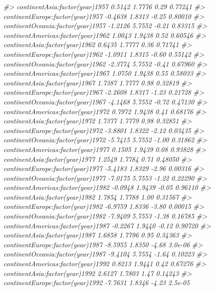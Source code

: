 \documentclass[]{book}
\newenvironment{Shaded}{\begin{snugshade}}{\end{snugshade}}
\newcommand{\CommentTok}[1]{\textcolor[rgb]{0.56,0.35,0.01}{\textit{#1}}}
\begin{document}
\begin{Shaded}
\begin{Highlighting}[]
\CommentTok{#> continentAsia:factor(year)1957       0.5142     1.7776    0.29  0.77241}
\CommentTok{#> continentEurope:factor(year)1957    -0.4638     1.8313   -0.25  0.80010}
\CommentTok{#> continentOceania:factor(year)1957   -1.2126     5.7552   -0.21  0.83315}
\CommentTok{#> continentAmericas:factor(year)1962   1.0043     1.9438    0.52  0.60546}
\CommentTok{#> continentAsia:factor(year)1962       0.6435     1.7777    0.36  0.71741}
\CommentTok{#> continentEurope:factor(year)1962    -1.0911     1.8315   -0.60  0.55142}
\CommentTok{#> continentOceania:factor(year)1962   -2.3774     5.7552   -0.41  0.67960}
\CommentTok{#> continentAmericas:factor(year)1967   1.0750     1.9438    0.55  0.58033}
\CommentTok{#> continentAsia:factor(year)1967       1.7387     1.7777    0.98  0.32819}
\CommentTok{#> continentEurope:factor(year)1967    -2.2608     1.8317   -1.23  0.21728}
\CommentTok{#> continentOceania:factor(year)1967   -4.1468     5.7552   -0.72  0.47130}
\CommentTok{#> continentAmericas:factor(year)1972   0.7972     1.9438    0.41  0.68176}
\CommentTok{#> continentAsia:factor(year)1972       1.7377     1.7779    0.98  0.32851}
\CommentTok{#> continentEurope:factor(year)1972    -3.8801     1.8322   -2.12  0.03435}
\CommentTok{#> continentOceania:factor(year)1972   -5.7415     5.7552   -1.00  0.31862}
\CommentTok{#> continentAmericas:factor(year)1977   0.1505     1.9439    0.08  0.93828}
\CommentTok{#> continentAsia:factor(year)1977       1.2549     1.7784    0.71  0.48050}
\CommentTok{#> continentEurope:factor(year)1977    -5.4183     1.8329   -2.96  0.00316}
\CommentTok{#> continentOceania:factor(year)1977   -7.0175     5.7553   -1.22  0.22290}
\CommentTok{#> continentAmericas:factor(year)1982  -0.0948     1.9439   -0.05  0.96110}
\CommentTok{#> continentAsia:factor(year)1982       1.7854     1.7788    1.00  0.31567}
\CommentTok{#> continentEurope:factor(year)1982    -6.9759     1.8336   -3.80  0.00015}
\CommentTok{#> continentOceania:factor(year)1982   -7.9409     5.7553   -1.38  0.16785}
\CommentTok{#> continentAmericas:factor(year)1987  -0.2267     1.9440   -0.12  0.90720}
\CommentTok{#> continentAsia:factor(year)1987       1.6858     1.7796    0.95  0.34363}
\CommentTok{#> continentEurope:factor(year)1987    -8.5955     1.8350   -4.68  3.0e-06}
\CommentTok{#> continentOceania:factor(year)1987   -9.4104     5.7554   -1.64  0.10223}
\CommentTok{#> continentAmericas:factor(year)1992   0.8213     1.9441    0.42  0.67276}
\CommentTok{#> continentAsia:factor(year)1992       2.6127     1.7803    1.47  0.14243}
\CommentTok{#> continentEurope:factor(year)1992    -7.7631     1.8346   -4.23  2.5e-05}

\end{Highlighting}
\end{Shaded}
\end{document}
